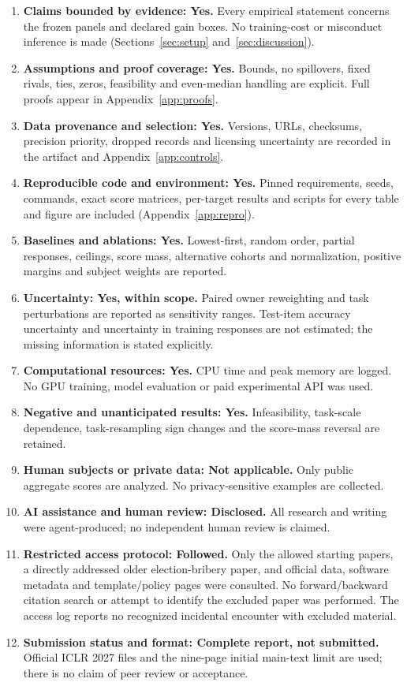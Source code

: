 \documentclass{article}
\begin{document}
\begin{enumerate}
\item \textbf{Claims bounded by evidence: Yes.} Every empirical statement concerns
the frozen panels and declared gain boxes. No training-cost or misconduct inference
is made (Sections~\ref{sec:setup} and~\ref{sec:discussion}).
\item \textbf{Assumptions and proof coverage: Yes.} Bounds, no spillovers, fixed
rivals, ties, zeros, feasibility and even-median handling are explicit. Full proofs
appear in Appendix~\ref{app:proofs}.
\item \textbf{Data provenance and selection: Yes.} Versions, URLs, checksums,
precision priority, dropped records and licensing uncertainty are recorded in
the artifact and Appendix~\ref{app:controls}.
\item \textbf{Reproducible code and environment: Yes.} Pinned requirements, seeds,
commands, exact score matrices, per-target results and scripts for every table
and figure are included (Appendix~\ref{app:repro}).
\item \textbf{Baselines and ablations: Yes.} Lowest-first, random order,
partial responses, ceilings, score mass, alternative cohorts and normalization,
positive margins and subject weights are reported.
\item \textbf{Uncertainty: Yes, within scope.} Paired owner reweighting and task
perturbations are reported as sensitivity ranges. Test-item accuracy uncertainty
and uncertainty in training responses are not estimated; the missing information
is stated explicitly.
\item \textbf{Computational resources: Yes.} CPU time and peak memory are logged.
No GPU training, model evaluation or paid experimental API was used.
\item \textbf{Negative and unanticipated results: Yes.} Infeasibility, task-scale
dependence, task-resampling sign changes and the score-mass reversal are retained.
\item \textbf{Human subjects or private data: Not applicable.} Only public aggregate
scores are analyzed. No privacy-sensitive examples are collected.
\item \textbf{AI assistance and human review: Disclosed.} All research and writing
were agent-produced; no independent human review is claimed.
\item \textbf{Restricted access protocol: Followed.} Only the allowed starting
papers, a directly addressed older election-bribery paper, and official data,
software metadata and template/policy pages were consulted. No forward/backward
citation search or attempt to identify the excluded paper was performed. The
access log reports no recognized incidental encounter with excluded material.
\item \textbf{Submission status and format: Complete report, not submitted.}
Official ICLR 2027 files and the nine-page initial main-text limit are used;
there is no claim of peer review or acceptance.
\end{enumerate}
\end{document}
